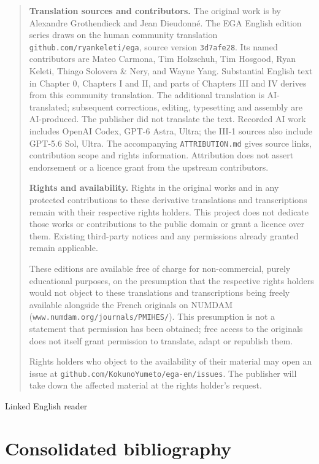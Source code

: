 \begingroup
\small
\begin{quote}
\textbf{Translation sources and contributors.}
The original work is by Alexandre Grothendieck and Jean Dieudonn\'e.
The EGA English edition series draws on the human community translation
\texttt{github.com/ryankeleti/ega}, source version \texttt{3d7afe28}.
Its named contributors are Mateo Carmona, Tim Holzschuh, Tim Hosgood,
Ryan Keleti, Thiago Solovera \& Nery, and Wayne Yang.
Substantial English text in Chapter 0, Chapters I and II, and parts of Chapters III and IV derives from this community translation.
The additional translation is AI-translated; subsequent corrections, editing,
typesetting and assembly are AI-produced. The publisher did not translate
the text. Recorded AI work includes OpenAI Codex,
GPT-6 Astra, Ultra; the III-1 sources also include GPT-5.6 Sol, Ultra.
The accompanying \texttt{ATTRIBUTION.md} gives source links, contribution
scope and rights information. Attribution does not assert endorsement
or a licence grant from the upstream contributors.

\medskip
\textbf{Rights and availability.}
Rights in the original works and in any protected contributions to these
derivative translations and transcriptions remain with their respective
rights holders. This project does not dedicate those works or contributions
to the public domain or grant a licence over them. Existing third-party
notices and any permissions already granted remain applicable.

These editions are available free of charge for non-commercial, purely
educational purposes, on the presumption that the respective rights holders
would not object to these translations and transcriptions being freely
available alongside the French originals on NUMDAM
(\texttt{www.numdam.org/journals/PMIHES/}). This presumption is not a statement
that permission has been obtained; free access to the originals does not
itself grant permission to translate, adapt or republish them.

Rights holders who object to the availability of their material may open
an issue at \texttt{github.com/KokunoYumeto/ega-en/issues}. The publisher
will take down the affected material at the rights holder's request.
\end{quote}
\endgroup


\label{reader:ega-global}

\begin{center}
\large Linked English reader
\end{center}

\tableofcontents







\clearpage
{}
{}
\section*{Consolidated bibliography}
\nocite{*}




